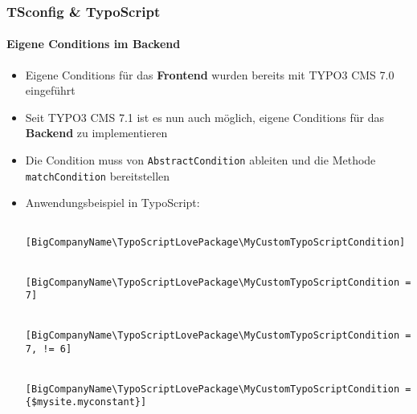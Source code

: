
\begin{frame}[fragile]
	\frametitle{TSconfig \& TypoScript}
	\framesubtitle{Eigene Conditions im Backend}

	\lstset{basicstyle=\tiny\ttfamily}

	\begin{itemize}

		\item Eigene Conditions für das \textbf{Frontend} wurden bereits mit TYPO3 CMS 7.0 eingeführt
		\item Seit TYPO3 CMS 7.1 ist es nun auch möglich, eigene Conditions für das \textbf{Backend} zu implementieren
		\item Die Condition muss von \texttt{AbstractCondition} ableiten und die Methode \texttt{matchCondition} bereitstellen
		\item Anwendungsbeispiel in TypoScript:

			\begin{lstlisting}
				[BigCompanyName\TypoScriptLovePackage\MyCustomTypoScriptCondition]

				[BigCompanyName\TypoScriptLovePackage\MyCustomTypoScriptCondition = 7]

				[BigCompanyName\TypoScriptLovePackage\MyCustomTypoScriptCondition = 7, != 6]

				[BigCompanyName\TypoScriptLovePackage\MyCustomTypoScriptCondition = {$mysite.myconstant}]
			\end{lstlisting}

	\end{itemize}

\end{frame}



